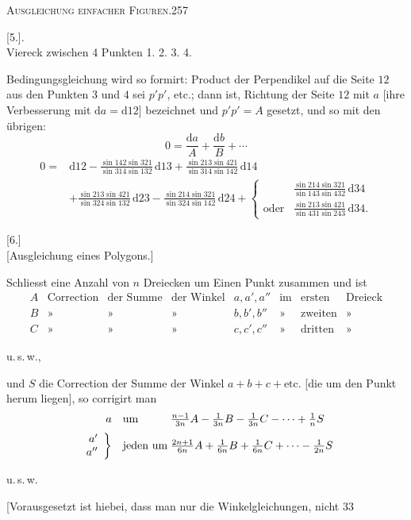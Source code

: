 \clearpage
\noindent\mbox{}\hfill\textsc{Ausgleichung einfacher Figuren.}\hfill257\par\medskip
\begin{center}[5.]\hspace{.5em}.\\[5pt]Viereck zwischen 4 Punkten 1. 2. 3. 4.\end{center}
Bedingungsgleichung wird so formirt: Product der Perpendikel auf die Seite $12$ aus den Punkten $3$ und $4$ sei $p'p'$, etc.; dann ist, Richtung der Seite $12$ mit $a$ [ihre Verbesserung mit $\mathrm da=\mathrm d12$] bezeichnet und $p'p'=A$ gesetzt, und so mit den übrigen:
\[
0=\frac{\mathrm da}A+\frac{\mathrm db}B+\cdots
\]
\noindent[oder]
\[
\begin{aligned}
0={}&\mathrm d12-\tfrac{\sin142\sin321}{\sin314\sin132}\,\mathrm d13+\tfrac{\sin213\sin421}{\sin314\sin142}\,\mathrm d14\\
&+\tfrac{\sin213\sin421}{\sin324\sin132}\,\mathrm d23-\tfrac{\sin214\sin321}{\sin324\sin142}\,\mathrm d24
+\left\{\begin{array}{cl}
&\tfrac{\sin214\sin321}{\sin143\sin432}\,\mathrm d34\\[5pt]
\text{oder}&\tfrac{\sin213\sin421}{\sin431\sin243}\,\mathrm d34.
\end{array}\right.
\end{aligned}
\]
\bigskip
\begin{center}[6.]\\[5pt][Ausgleichung eines Polygons.]\end{center}
Schliesst eine Anzahl von $n$ Dreiecken um Einen Punkt zusammen und ist
\[
\begin{array}{rlllllll}
A&\text{Correction}&\text{der Summe}&\text{der Winkel}&a,a',a''&\text{im}&\text{ersten}&\text{Dreieck}\\
B&\text{»}&\text{»}&\text{»}&b,b',b''&\text{»}&\text{zweiten}&\text{»}\\
C&\text{»}&\text{»}&\text{»}&c,c',c''&\text{»}&\text{dritten}&\text{»}
\end{array}
\]
\begin{center}u.\,s.\,w.,\end{center}
und $S$ die Correction der Summe der Winkel $a+b+c+\text{etc.}$ [die um den Punkt herum liegen], so corrigirt man
\[
\begin{array}{r@{\quad}l@{\;}l}
a&\text{um}&\tfrac{n-1}{3n}A-\tfrac1{3n}B-\tfrac1{3n}C-\cdots+\tfrac1nS\\[6pt]
\left.\begin{array}{r}a'\\a''\end{array}\right\}&\text{jeden um}&\tfrac{2n+1}{6n}A+\tfrac1{6n}B+\tfrac1{6n}C+\cdots-\tfrac1{2n}S
\end{array}
\]
\begin{center}u.\,s.\,w.\end{center}
[Vorausgesetzt ist hiebei, dass man nur die Winkelgleichungen, nicht
\vfill{}\hfill33

